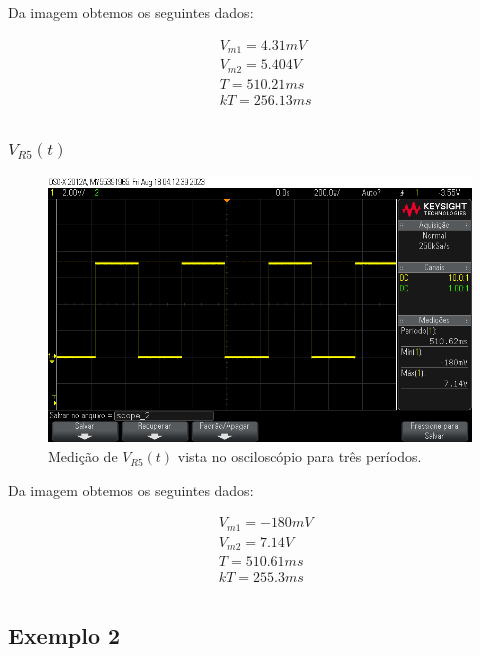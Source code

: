Da imagem obtemos os seguintes dados:

\begin{equation}
    \begin{aligned}
         & V_{m1} = 4.31mV \\
         & V_{m2} = 5.404V \\
         & T = 510.21ms    \\
         & kT =  256.13ms  \\
    \end{aligned}
\end{equation}

\subsubsection{$V_{R5} (t)$}

\begin{figure}[h]
    \centering
    \includegraphics[width=0.7\columnwidth]{images/ex1_r5.png}
    \caption{Medição de $V_{R5}(t)$ vista no osciloscópio para três períodos.}
\end{figure}

Da imagem obtemos os seguintes dados:

\begin{equation}
    \begin{aligned}
         & V_{m1} = -180mV \\
         & V_{m2} = 7.14V  \\
         & T = 510.61ms    \\
         & kT =  255.3ms   \\
    \end{aligned}
\end{equation}


\subsection{Exemplo 2}

